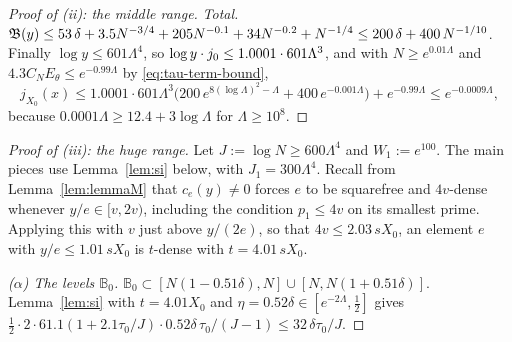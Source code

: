 \begin{proof}[Proof of (ii): the middle range]
\emph{Total.} $\mathfrak{B}(y)\le53\,\delta+3.5N^{-3/4}+205N^{-0.1}+34N^{-0.2}+N^{-1/4}\le200\,\delta+400\,N^{-1/10}$. Finally
$\log y\le601\Lambda^4$, so $\log y\cdot j_0\le1.0001\cdot601\Lambda^3$, and with $N\ge e^{0.01\Lambda}$ and
$4.3C_NE_\theta\le e^{-0.99\Lambda}$ by \eqref{eq:tau-term-bound},
\[
  j_{X_0}(x)\le1.0001\cdot601\Lambda^3\bigl(200\,e^{8(\log\Lambda)^2-\Lambda}+400\,e^{-0.001\Lambda}\bigr)+e^{-0.99\Lambda}\le e^{-0.0009\Lambda},
\]
because $0.0001\Lambda\ge12.4+3\log\Lambda$ for $\Lambda\ge10^8$.
\end{proof}

\begin{proof}[Proof of (iii): the huge range]
Let $J:=\log N\ge600\Lambda^4$ and $W_1:=e^{100}$. The main pieces use Lemma~\ref{lem:si} below, with $J_1=300\Lambda^4$.
Recall from Lemma~\ref{lem:lemmaM} that $c_e(y)\ne0$ forces $e$ to be squarefree and $4v$-dense whenever $y/e\in[v,2v)$,
including the condition $p_1\le4v$ on its smallest prime.
Applying this with $v$ just above $y/(2e)$, so that $4v\le2.03\,sX_0$, an element $e$ with $y/e\le1.01\,sX_0$ is $t$-dense
with $t=4.01\,sX_0$.

\emph{($\alpha$) The levels $\mathbb B_0$.} $\mathbb B_0\subset[N(1-0.51\delta),N]\cup[N,N(1+0.51\delta)]$. Lemma~\ref{lem:si}
with $t=4.01X_0$ and $\eta=0.52\delta\in[e^{-2\Lambda},\frac12]$ gives
$\frac12\cdot2\cdot61.1(1+2.1\tau_0/J)\cdot0.52\delta\,\tau_0/(J-1)\le32\,\delta\tau_0/J$.


\end{proof}

